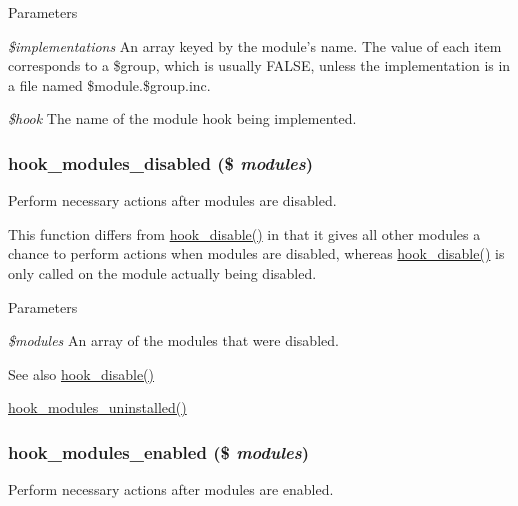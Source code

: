 \begin{DoxyParams}{Parameters}
\item[{\em \$implementations}]An array keyed by the module's name. The value of each item corresponds to a \$group, which is usually FALSE, unless the implementation is in a file named \$module.\$group.inc. \item[{\em \$hook}]The name of the module hook being implemented. \end{DoxyParams}
\hypertarget{group__hooks_ga591c577fba8ca8dc8ec17f8bf80bdc4c}{
\subsubsection[{hook\_\-modules\_\-disabled}]{\setlength{\rightskip}{0pt plus 5cm}hook\_\-modules\_\-disabled (\$ {\em modules})}}
\label{group__hooks_ga591c577fba8ca8dc8ec17f8bf80bdc4c}
Perform necessary actions after modules are disabled.

This function differs from \hyperlink{group__hooks_ga5872573d2180aa4b306e7d6c08a74c10}{hook\_\-disable()} in that it gives all other modules a chance to perform actions when modules are disabled, whereas \hyperlink{group__hooks_ga5872573d2180aa4b306e7d6c08a74c10}{hook\_\-disable()} is only called on the module actually being disabled.


\begin{DoxyParams}{Parameters}
\item[{\em \$modules}]An array of the modules that were disabled.\end{DoxyParams}
\begin{DoxySeeAlso}{See also}
\hyperlink{group__hooks_ga5872573d2180aa4b306e7d6c08a74c10}{hook\_\-disable()} 

\hyperlink{group__hooks_ga4f29c7343438068a922459cbe0810279}{hook\_\-modules\_\-uninstalled()} 
\end{DoxySeeAlso}
\hypertarget{group__hooks_ga0eb7c67333e0f40b4a46c0dc4c4a92f3}{
\subsubsection[{hook\_\-modules\_\-enabled}]{\setlength{\rightskip}{0pt plus 5cm}hook\_\-modules\_\-enabled (\$ {\em modules})}}
\label{group__hooks_ga0eb7c67333e0f40b4a46c0dc4c4a92f3}
Perform necessary actions after modules are enabled.

